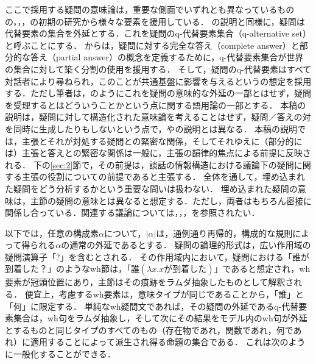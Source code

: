 \documentclass{goken}
\newcommand{\term}[2]{\textsf{#1}（#2）}
\newcommand{\ori}[1]{\noindent\textcolor[gray]{0.7}{\fontsize{8pt}{8pt}\selectfont{\textsf{(p.~#1)}}} }
\begin{document}
ここで採用する疑問の意味論は，重要な側面でいずれとも異なっているものの，\citet{Hamblin1973}，\citet{GroenendijkStokhof1984}，\citet{vonStechow1991}の初期の研究から様々な要素を援用している．
\citeauthor{Hamblin1973}の説明と同様に，疑問は代替要素の集合を外延とする．これを疑問の\term{q-代替要素集合}{q-alternative set}と呼ぶことにする．
\citeauthor{GroenendijkStokhof1984}からは，疑問に対する\term{完全な答え}{complete answer}と\term{部分的な答え}{partial answer}の概念を定義するために，q-代替要素集合が世界の集合に対して築く分割の使用を援用する．
そして，疑問のq-代替要素はすべて対話者により尋ねられ，このことが共通基盤に影響を与えるという\citeauthor{vonStechow1991}の想定を採用する．ただし筆者は，\citet{vonStechow1991}のようにこれを疑問の意味的な外延の一部とはせず，疑問を受理するとはどういうことかという点に関する語用論の一部とする．
本稿の説明は，疑問に対して構造化された意味論を考えることはせず，疑問／答えの対を同時に生成したりもしないという点で，\citeauthor{vonStechow1991}や\citeauthor{GroenendijkStokhof1984}の説明とは異なる．
本稿の説明では，主張とそれが対処する疑問との緊密な関係，そしてそれゆえに（部分的には）主張と答えとの緊密な関係は一般に，主張の韻律的焦点による前提に反映される．
下の\ref{sec:2}節で，その前提は，談話の情報構造における議論下の疑問に関する主張の役割についての前提であると主張する．
全体を通して，埋め込まれた疑問をどう分析するかという重要な問いは扱わない．
埋め込まれた疑問の意味は，主節の疑問の意味とは異なると想定する．ただし，両者はもちろん密接に関係し合っている．関連する議論については，\citet{Jacobson1995}，\citet{Ginzburg1995a, Ginzburg1995b}，\citet{Higginbotham1996}を参照されたい．

以下では，任意の構成素$\alpha$について，$|\alpha|$は，通例通り再帰的，構成的な規則によって得られる$\alpha$の通常の外延であるとする．
疑問の論理的形式は，広い作用域の疑問演算子「?」を含むとされる．
その作用域内において，疑問における「誰が到着した？」のようなwh節は，「$\text{誰}(\lambda x.x \text{が到着した})$」であると想定され，wh要素が冠頭位置にあり，主節はその痕跡をラムダ抽象したものとして解釈される．%
\ori{10}
便宜上，考慮するwh要素は，意味タイプが同じであることから，「誰」と「何」に限定する．%
単純なwh疑問文であれば，その疑問の外延であるq-代替要素集合は，wh句をラムダ抽象し，そして次にその結果をモデル内のwh句が外延とするものと同じタイプのすべてのもの（存在物であれ，関数であれ，何であれ）に適用することによって派生され得る命題の集合である．
これは次のように一般化することができる．
\end{document}
